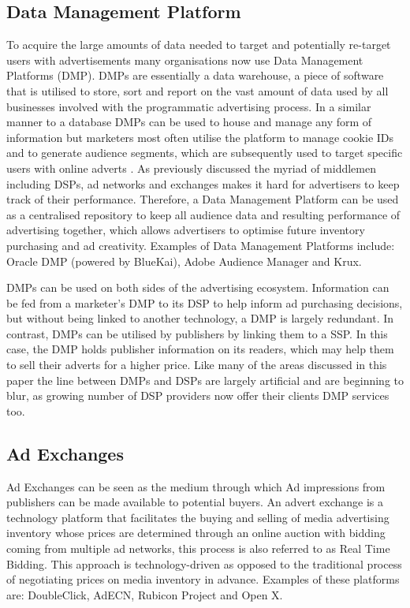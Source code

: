 \documentclass[12pt]{article}
\begin{document}
\subsection{ Data Management Platform}
To acquire the large amounts of data needed to target and potentially re-target users with advertisements many organisations now use Data Management Platforms (DMP). DMPs are essentially a data warehouse, a piece of software that is utilised to store, sort and report on the vast amount of data used by all businesses involved with the programmatic advertising process. In a similar manner to a database DMPs can be used to house and manage any form of information but marketers most often utilise the platform to manage cookie IDs and to generate audience segments, which are subsequently used to target specific users with online adverts \parencite{DMP}. As previously discussed the myriad of middlemen including DSPs, ad networks and exchanges makes it hard for advertisers to keep track of their performance. Therefore, a Data Management Platform can be used as a centralised repository to keep all audience data and resulting performance of advertising together, which allows advertisers to optimise future inventory purchasing and ad creativity. Examples of Data Management Platforms include: Oracle DMP (powered by BlueKai), Adobe Audience Manager and Krux. \newline

DMPs can be used on both sides of the advertising ecosystem. Information can be fed from a marketer's DMP to its DSP to help inform ad purchasing decisions, but without being linked to another technology, a DMP is largely redundant. In contrast, DMPs can be 
utilised by publishers by linking them to a SSP. In this case, the DMP holds publisher information on its readers, which may help them to sell their adverts for a higher price. Like many of the areas discussed in this paper the line between DMPs and DSPs are largely artificial and are beginning to blur, as growing number of DSP providers now offer their clients DMP services too.  

\subsection{ Ad Exchanges} \label{AdExchanges}
Ad Exchanges can be seen as the medium through which Ad impressions from publishers can be made available to potential buyers. An advert exchange is a technology platform that facilitates the buying and selling of media advertising inventory whose prices are determined through an online auction with bidding coming from multiple ad networks, this process is also referred to as Real Time Bidding. This approach is technology-driven as opposed to the traditional process of negotiating prices on media inventory in advance. Examples of these platforms are: DoubleClick, AdECN, Rubicon Project and Open X. \newline
\end{document}
